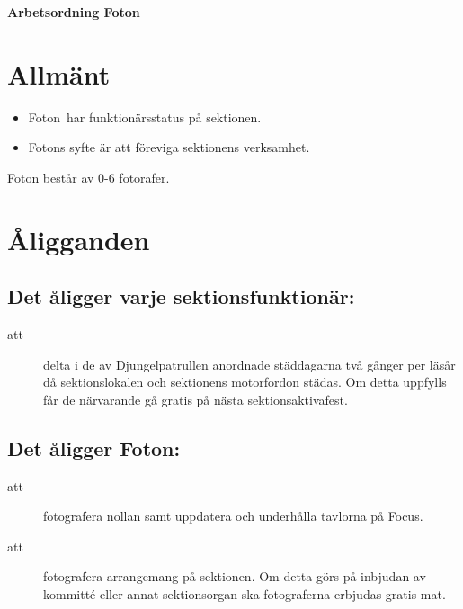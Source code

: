 \renewcommand{\dateseparator}{-} %

\renewcommand{\forening}{Foton}

\begin{center}
\LARGE{\textbf{Arbetsordning \forening}}
\end{center}


\section{Allmänt}
\begin{itemize}
\item \forening~har funktionärsstatus på sektionen.
\item \forening s syfte är att föreviga sektionens verksamhet.
\end{itemize}

Foton består av 0-6 fotorafer.

\section{Åligganden}
\subsection{Det åligger varje sektionsfunktionär:}
    \begin{description}
      \item[att] delta i de av Djungelpatrullen anordnade städdagarna två gånger per
      läsår då sektionslokalen och sektionens motorfordon städas. Om detta uppfylls får de närvarande gå gratis på nästa sektionsaktivafest.
    \end{description}


\subsection{Det åligger Foton:}
    \begin{description}
    \item[att] fotografera nollan samt uppdatera och underhålla tavlorna på Focus.
    \item[att] fotografera arrangemang på sektionen. Om detta görs på inbjudan av kommitté eller annat sektionsorgan ska fotograferna erbjudas gratis mat.
    \end{description}


